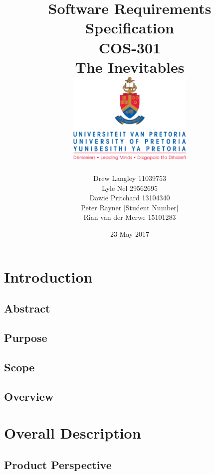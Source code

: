 \documentclass{article}
\title{ Software Requirements Specification \\ COS-301 \\ The Inevitables \\[0.5cm] \includegraphics[width=6cm]{front-page}}
\author{Drew Langley \hfill 11039753 \\ Lyle Nel \hfill 29562695 \\ Dawie Pritchard \hfill 13104340 \\  Peter Rayner \hfill [Student Number]\\ Rian van der Merwe \hfill 15101283 }
\date{23 May 2017}
\begin{document}
\maketitle
\pagebreak
\tableofcontents
\pagebreak

\section{Introduction}
	\subsection{Abstract}
	
	
	
	\subsection{Purpose}

	
	
	\subsection{Scope}
	
	
	
	\subsection{Overview}
	
	
\section{Overall Description}
	\subsection{Product Perspective}
	
	
	
\end{document}
